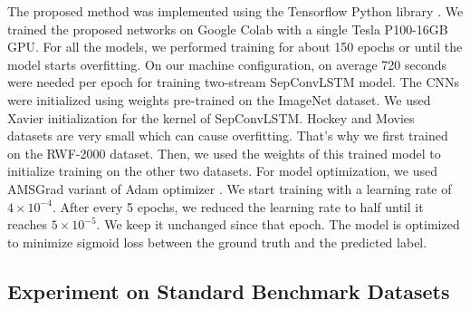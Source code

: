 \documentclass[conference]{IEEEtran}
\begin{document}
The proposed method was implemented using the Tensorflow Python library \cite{tensorflow2015-whitepaper}. We trained the proposed networks on Google Colab with a single Tesla P100-16GB GPU. For all the models, we performed training for about 150 epochs or until the model starts overfitting. On our machine configuration, on average 720 seconds were needed per epoch for training two-stream SepConvLSTM model. The CNNs were initialized using weights pre-trained on the ImageNet dataset. We used Xavier initialization \cite{glorot2010understanding} for the kernel of SepConvLSTM. Hockey and Movies datasets are very small which can cause overfitting. That's why we first trained on the RWF-2000 dataset. Then, we used the weights of this trained model to initialize training on the other two datasets. For model optimization, we used AMSGrad variant of Adam optimizer \cite{reddi2019convergence}. We start training with a learning rate of \(4\times10^{-4}\). After every 5 epochs, we reduced the learning rate to half until it reaches \(5\times 10^{-5}\). We keep it unchanged since that epoch. The model is optimized to minimize sigmoid loss between the ground truth and the predicted label. 



\subsection{Experiment on Standard Benchmark Datasets}
\end{document}
